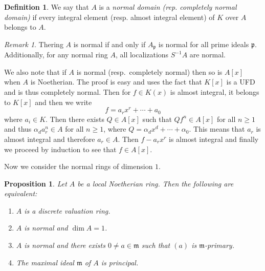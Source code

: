 \documentclass[leqno, openany]{memoir}
\newtheorem{prop}[thm]{Proposition}
\theoremstyle{definition}
\newtheorem{defn}[thm]{Definition}
\theoremstyle{remark}
\newtheorem{rmk}[thm]{Remark}
\theoremstyle{plain}
\theoremstyle{definition}
\theoremstyle{remark}
\newcommand{\mf}[1]{\mathfrak{#1}}
\begin{document}
\begin{defn} We say that $A$ is a \textit{normal domain (rep. completely normal
domain)} if every integral element (resp. almost integral element) of $K$ over
$A$ belongs to $A$.  \end{defn}

\begin{rmk} Thering $A$ is normal if and only if $A_{\mf{p}}$ is normal for all
prime ideals $\mf{p}$. Additionally, for any normal ring $A$, all localizations
$S^{-1}A$ are normal.  \end{rmk}

We also note that if $A$ is normal (resp.~completely normal) then so is $A[x]$
when $A$ is Noetherian. The proof is easy and uses the fact that $K[x]$ is a
UFD and is thus completely normal. Then for $f \in K(x)$ is almost integral, it
belongs to $K[x]$ and then we write \[ f = a_r x^r + \cdots + a_0 \] where $a_i
\in K$. Then there exists $Q \in A[x]$ such that $Q f^n \in A[x]$ for all $n
\geq 1$ and thus $\alpha_d a_r^n \in A$ for all $n \geq 1$, where $Q = \alpha_d
x^d + \cdots + \alpha_0$. This means that $a_r$ is almost integral and
therefore $a_r \in A$. Then $f - a_r x^r$ is almost integral and finally we
proceed by induction to see that $f \in A[x]$.

Now we consider the normal rings of dimension $1$.  \begin{prop} Let $A$ be a
    local Noetherian ring. Then the following are equivalent: \begin{enumerate}
        \item $A$ is a discrete valuation ring.  \item $A$ is normal and $\dim
            A = 1$.  \item $A$ is normal and there exists $0 \neq a \in \mf{m}$
            such that $(a)$ is $\mf{m}$-primary.  \item The maximal ideal
    $\mf{m}$ of $A$ is principal.  \end{enumerate} \end{prop}
\end{document}
